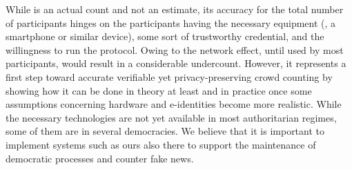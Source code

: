 While \CROCUS is an actual count and not an estimate, its accuracy for the total number of participants hinges on the participants having the necessary equipment (\ie, a smartphone or similar device), some sort of trustworthy credential, and the willingness to run the protocol. 
Owing to the network effect, until used by most participants, \CROCUS would result in a considerable undercount. 
However, it represents a first step toward accurate verifiable yet privacy-preserving crowd counting by showing how it can be done in theory at least and in practice once some assumptions concerning hardware and e-identities become more realistic. 
While the necessary technologies are not yet available in most authoritarian regimes, some of them are in several democracies. We believe that it is important to implement systems such as ours also there to support the maintenance of democratic processes and counter fake news.  

